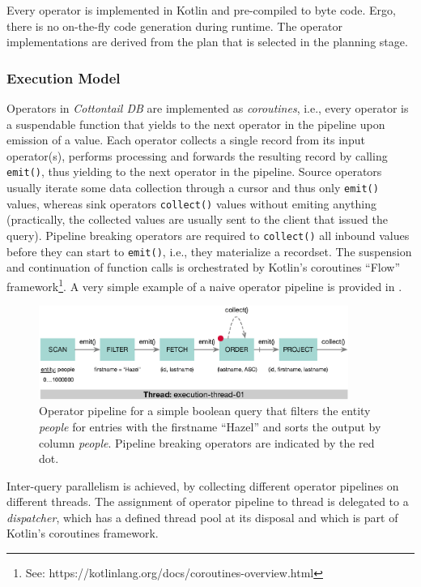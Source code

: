 Every operator is implemented in Kotlin and pre-compiled to byte code. Ergo, there is no on-the-fly code generation during runtime. The operator implementations are derived from the plan that is selected in the planning stage.

\subsubsection{Execution Model}

Operators in \emph{Cottontail DB} are implemented as \emph{coroutines}, i.e., every operator is a suspendable function that yields to the next operator in the pipeline upon emission of a value. Each operator collects a single record from its input operator(s), performs processing and forwards the resulting record by calling \texttt{emit()}, thus yielding to the next operator in the pipeline. Source operators usually iterate some data collection through a cursor and thus only \texttt{emit()} values, whereas sink operators \texttt{collect()} values without emiting anything (practically, the collected values are usually sent to the client that issued the query). Pipeline breaking operators are required to \texttt{collect()} all inbound values before they can start to \texttt{emit()}, i.e., they materialize a recordset. The suspension and continuation of function calls is orchestrated by Kotlin's coroutines ``Flow'' framework\footnote{See: https://kotlinlang.org/docs/coroutines-overview.html}. A very simple example of a naive operator pipeline is provided in .

\begin{figure}[bt]
    \centering
    \includegraphics[width=0.9\textwidth]{figures/execution-model-simple}
    \caption{Operator pipeline for a simple boolean query that filters the entity \emph{people} for entries with the firstname ``Hazel'' and sorts the output by column \emph{people}. Pipeline breaking operators are indicated by the red dot.}
    \label{figure:cottontail_execution_model_simple}
\end{figure}

Inter-query parallelism is achieved, by collecting different operator pipelines on different threads. The assignment of operator pipeline to thread is delegated to a \emph{dispatcher}, which has a defined thread pool at its disposal and which is part of Kotlin's coroutines framework. 

